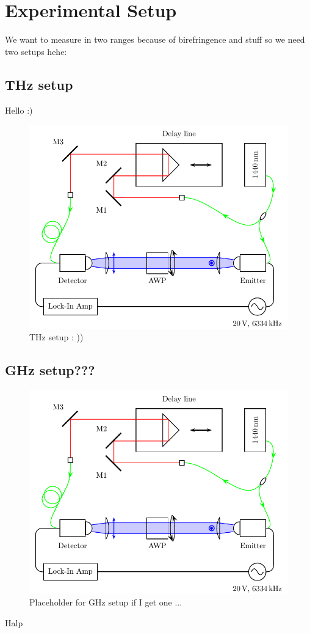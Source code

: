 \section{Experimental Setup}
We want to measure in two ranges because of birefringence and stuff so we need two setups hehe:

\subsection{THz setup}
Hello :)
\begin{figure}[h]
    \centering
    \includegraphics{images/4_chapter04/Setup1_TDS.pdf}
    \caption{THz setup : ))}
    \label{fig:THz_setup}
\end{figure}


\subsection{GHz setup???}
\begin{figure}[h]
    \centering
    \includegraphics{images/4_chapter04/Setup1_TDS.pdf}
    \caption{Placeholder for GHz setup if I get one ...}
    \label{fig:GHz_setup}
\end{figure}
Halp

